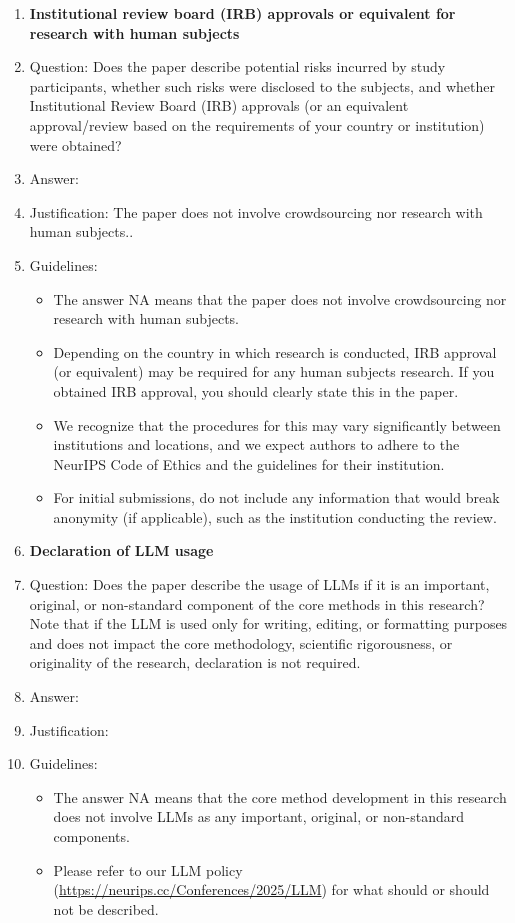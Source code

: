 \documentclass{article}
\theoremstyle{definition} \newtheorem{definition}{Definition}  \newtheorem{example}{Example}
\theoremstyle{remark} \newtheorem{remark}{Remark}
\newcounter{ct}
\begin{document}
\begin{enumerate}
\item {\bf Institutional review board (IRB) approvals or equivalent for research with human subjects}
    \item[] Question: Does the paper describe potential risks incurred by study participants, whether such risks were disclosed to the subjects, and whether Institutional Review Board (IRB) approvals (or an equivalent approval/review based on the requirements of your country or institution) were obtained?
    \item[] Answer: \answerNA{} %
    \item[] Justification: The paper does not involve crowdsourcing nor research with human subjects..
    \item[] Guidelines:
    \begin{itemize}
        \item The answer NA means that the paper does not involve crowdsourcing nor research with human subjects.
        \item Depending on the country in which research is conducted, IRB approval (or equivalent) may be required for any human subjects research. If you obtained IRB approval, you should clearly state this in the paper. 
        \item We recognize that the procedures for this may vary significantly between institutions and locations, and we expect authors to adhere to the NeurIPS Code of Ethics and the guidelines for their institution. 
        \item For initial submissions, do not include any information that would break anonymity (if applicable), such as the institution conducting the review.
    \end{itemize}

\item {\bf Declaration of LLM usage}
    \item[] Question: Does the paper describe the usage of LLMs if it is an important, original, or non-standard component of the core methods in this research? Note that if the LLM is used only for writing, editing, or formatting purposes and does not impact the core methodology, scientific rigorousness, or originality of the research, declaration is not required.
    \item[] Answer: \answerTODO{} %
    \item[] Justification: \justificationTODO{}
    \item[] Guidelines:
    \begin{itemize}
        \item The answer NA means that the core method development in this research does not involve LLMs as any important, original, or non-standard components.
        \item Please refer to our LLM policy (\url{https://neurips.cc/Conferences/2025/LLM}) for what should or should not be described.
    \end{itemize}

\end{enumerate}
\end{document}
